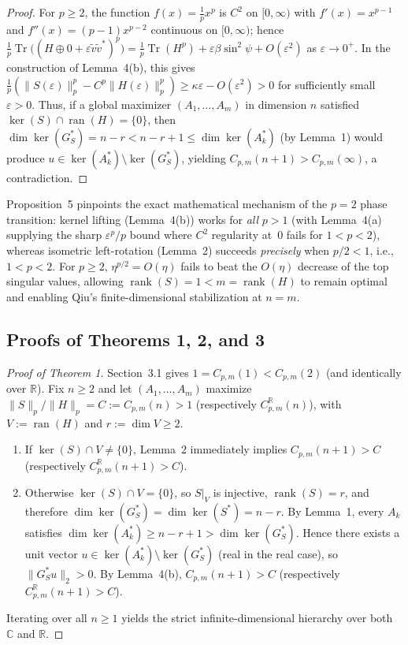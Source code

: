 \documentclass[10pt,letterpaper]{article}
\newcommand{\C}{\mathbb{C}}
\newcommand{\R}{\mathbb{R}}
\newcommand{\Tr}{\operatorname{Tr}}
\newcommand{\ran}{\operatorname{ran}}
\newcommand{\rank}{\operatorname{rank}}
\begin{document}
\begin{proof}
For $p \ge 2$, the function $f(x) = \frac{1}{p}x^p$ is $C^2$ on $[0,\infty)$ with $f'(x) = x^{p-1}$ and $f''(x) = (p-1)x^{p-2}$ continuous on $[0,\infty)$; hence $\frac{1}{p}\Tr\bigl((H \oplus 0 + \varepsilon\tilde{v}\tilde{v}^*)^p\bigr) = \frac{1}{p}\Tr(H^p) + \varepsilon\beta\sin^2\psi + O(\varepsilon^2)$ as $\varepsilon \to 0^+$. In the construction of Lemma~4(b), this gives $\frac{1}{p}(\|S(\varepsilon)\|_p^p - C^p\|H(\varepsilon)\|_p^p) \ge \kappa\varepsilon - O(\varepsilon^2) > 0$ for sufficiently small $\varepsilon > 0$. Thus, if a global maximizer $(A_1,\dots,A_m)$ in dimension $n$ satisfied $\ker(S) \cap \ran(H) = \{0\}$, then $\dim\ker(G_S^*) = n - r < n - r + 1 \le \dim\ker(A_k^*)$ (by Lemma~1) would produce $u \in \ker(A_k^*) \setminus \ker(G_S^*)$, yielding $C_{p,m}(n+1) > C_{p,m}(\infty)$, a contradiction.
\end{proof}

Proposition~5 pinpoints the exact mathematical mechanism of the $p = 2$ phase transition: kernel lifting (Lemma~4(b)) works for \emph{all} $p > 1$ (with Lemma~4(a) supplying the sharp $\varepsilon^p/p$ bound where $C^2$ regularity at~$0$ fails for $1 < p < 2$), whereas isometric left-rotation (Lemma~2) succeeds \emph{precisely} when $p/2 < 1$, i.e., $1 < p < 2$. For $p \ge 2$, $\eta^{p/2} = O(\eta)$ fails to beat the $O(\eta)$ decrease of the top singular values, allowing $\rank(S) = 1 < m = \rank(H)$ to remain optimal and enabling Qiu's finite-dimensional stabilization at $n = m$.

\subsection{Proofs of Theorems 1, 2, and 3}

\begin{proof}[Proof of Theorem 1]
Section~3.1 gives $1 = C_{p,m}(1) < C_{p,m}(2)$ (and identically over $\R$). Fix $n \ge 2$ and let $(A_1,\dots,A_m)$ maximize $\|S\|_p / \|H\|_p = C := C_{p,m}(n) > 1$ (respectively $C_{p,m}^{\R}(n)$), with $V := \ran(H)$ and $r := \dim V \ge 2$.
\begin{enumerate}[leftmargin=1.6em,itemsep=2pt]
  \item If $\ker(S) \cap V \neq \{0\}$, Lemma~2 immediately implies $C_{p,m}(n+1) > C$ (respectively $C_{p,m}^{\R}(n+1) > C$).
  \item Otherwise $\ker(S) \cap V = \{0\}$, so $S|_V$ is injective, $\rank(S) = r$, and therefore $\dim\ker(G_S^*) = \dim\ker(S^*) = n - r$. By Lemma~1, every $A_k$ satisfies $\dim\ker(A_k^*) \ge n - r + 1 > \dim\ker(G_S^*)$. Hence there exists a unit vector $u \in \ker(A_k^*) \setminus \ker(G_S^*)$ (real in the real case), so $\|G_S^* u\|_2 > 0$. By Lemma~4(b), $C_{p,m}(n+1) > C$ (respectively $C_{p,m}^{\R}(n+1) > C$).
\end{enumerate}
Iterating over all $n \ge 1$ yields the strict infinite-dimensional hierarchy over both $\C$ and $\R$.
\end{proof}
\end{document}
